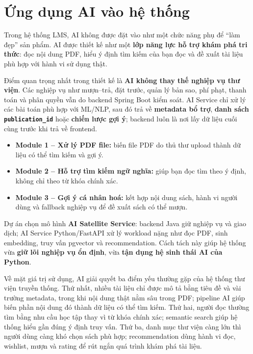 \section{Ứng dụng AI vào hệ thống}
Trong hệ thống LMS, AI không được đặt vào như một chức năng phụ để ``làm đẹp'' sản phẩm. AI được thiết kế như một \textbf{lớp năng lực hỗ trợ khám phá tri thức}: đọc nội dung PDF, hiểu ý định tìm kiếm của bạn đọc và đề xuất tài liệu phù hợp với hành vi sử dụng thật.

Điểm quan trọng nhất trong thiết kế là \textbf{AI không thay thế nghiệp vụ thư viện}. Các nghiệp vụ như mượn--trả, đặt trước, quản lý bản sao, phí phạt, thanh toán và phân quyền vẫn do backend Spring Boot kiểm soát. AI Service chỉ xử lý các bài toán phù hợp với ML/NLP, sau đó trả về \textbf{metadata bổ trợ}, \textbf{danh sách \texttt{publication\_id}} hoặc \textbf{chiến lược gợi ý}; backend luôn là nơi lấy dữ liệu cuối cùng trước khi trả về frontend.

\begin{itemize}
    \item \textbf{Module 1 -- Xử lý PDF file:} biến file PDF do thủ thư upload thành dữ liệu có thể tìm kiếm và gợi ý.
    \item \textbf{Module 2 -- Hỗ trợ tìm kiếm ngữ nghĩa:} giúp bạn đọc tìm theo ý định, không chỉ theo từ khóa chính xác.
    \item \textbf{Module 3 -- Gợi ý cá nhân hoá:} kết hợp nội dung sách, hành vi người dùng và fallback nghiệp vụ để đề xuất sách có thể mượn.
\end{itemize}

Dự án chọn mô hình \textbf{AI Satellite Service}: backend Java giữ nghiệp vụ và giao dịch; AI Service Python/FastAPI xử lý workload nặng như đọc PDF, sinh embedding, truy vấn pgvector và recommendation. Cách tách này giúp hệ thống vừa \textbf{giữ lõi nghiệp vụ ổn định}, vừa \textbf{tận dụng hệ sinh thái AI của Python}.

Về mặt giá trị sử dụng, AI giải quyết ba điểm yếu thường gặp của hệ thống thư
viện truyền thống. Thứ nhất, nhiều tài liệu chỉ được mô tả bằng tiêu đề và vài
trường metadata, trong khi nội dung thật nằm sâu trong PDF; pipeline AI giúp
biến phần nội dung đó thành dữ liệu có thể tìm kiếm. Thứ hai, người đọc thường
tìm bằng nhu cầu học tập thay vì từ khóa chính xác; semantic search giúp hệ
thống hiểu gần đúng ý định truy vấn. Thứ ba, danh mục thư viện càng lớn thì
người dùng càng khó chọn sách phù hợp; recommendation dùng hành vi đọc, wishlist,
mượn và rating để rút ngắn quá trình khám phá tài liệu.

